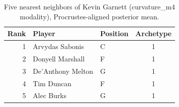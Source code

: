 \begin{table}[htbp]
  \centering\small
  \begin{tabular}{rllc}
    \toprule
    Rank & Player & Position & Archetype \\
    \midrule
    1 & Arvydas Sabonis & C & 1 \\
    2 & Donyell Marshall & F & 1 \\
    3 & De'Anthony Melton & G & 1 \\
    4 & Tim Duncan & F & 1 \\
    5 & Alec Burks & G & 1 \\
    \bottomrule
  \end{tabular}
  \caption{Five nearest neighbors of Kevin Garnett (curvature_m4 modality), Procrustes-aligned posterior mean.}
  \label{tab:Kevin_Garnett_neighbors_curvature_m4}
\end{table}

